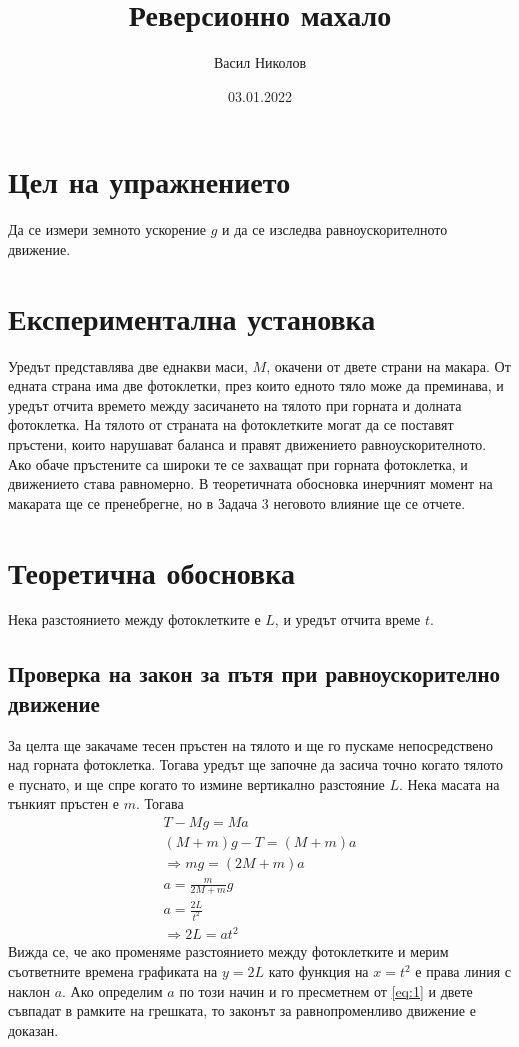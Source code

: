 \documentclass[aps, prb, twocolumn, a4paper, floatfix, reprint]{revtex4-2}
\begin{document}
\title{Реверсионно махало}
\author{Васил Николов}
\noaffiliation
\date{03.01.2022}
\maketitle
\section{Цел на упражнението}
Да се измери земното ускорение $g$ и да се изследва равноускорителното движение. 

\section{Експериментална установка}
Уредът представлява две еднакви маси, $M$, окачени от двете страни на макара. От едната страна има две фотоклетки, през които едното тяло може да преминава, и уредът отчита времето между засичането на тялото при горната и долната фотоклетка. На тялото от страната на фотоклетките могат да се поставят пръстени, които нарушават баланса и правят движението равноускорителното. Ако обаче пръстените са широки те се захващат при горната фотоклетка, и движението става равномерно. В теоретичната обосновка инерчният момент на макарата ще се пренебрегне, но в Задача 3 неговото влияние ще се отчете. 

\section{Теоретична обосновка}
Нека разстоянието между фотоклетките е $L$, и уредът отчита време $t$. 
\subsection{Проверка на закон за пътя при равноускорително движение}
За целта ще закачаме тесен пръстен на тялото и ще го пускаме непосредствено над горната фотоклетка. Тогава уредът ще започне да засича точно когато тялото е пуснато, и ще спре когато то измине вертикално разстояние $L$. Нека масата на тънкият пръстен е $m$. Тогава
\begin{gather*}
    T - Mg = Ma \\
    (M + m)g - T = (M+m)a\\
    \Rightarrow mg = (2M + m)a \\
    a = \frac{m}{2M + m}g \label{eq:1} \tag{1}\\ 
    a = \frac{2L}{t^2} \\
    \Rightarrow 2L = at^2 \label{eq:2} \tag{2}
\end{gather*}
Вижда се, че ако променяме разстоянието между фотоклетките и мерим съответните времена графиката на $y=2L$ като функция на $x=t^2$ е права линия с наклон $a$. Ако определим $a$ по този начин и го пресметнем от \eqref{eq:1} и двете съвпадат в рамките на грешката, то законът за равнопроменливо движение е доказан. 
\end{document}
